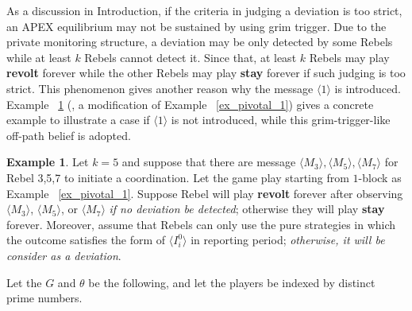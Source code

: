 \documentclass[12pt,letter]{article}
\theoremstyle{definition}
\newtheorem{example}{Example}[section]
\theoremstyle{remark}
\theoremstyle{claim}
\begin{document}
As a discussion in Introduction, if the criteria in judging a deviation is too strict, an APEX equilibrium may not be sustained by using grim trigger. Due to the private monitoring structure, a deviation may be only detected by some Rebels while at least $k$ Rebels cannot detect it. Since that, at least $k$ Rebels may play \textbf{revolt} forever while the other Rebels may play \textbf{stay} forever if such judging is too strict. This phenomenon gives another reason why the message $\langle 1 \rangle$ is introduced. Example ~\ref{ex_deviation} (, a modification of Example ~\ref{ex_pivotal_1}) gives a concrete example to illustrate a case if $\langle 1 \rangle$ is not introduced, while this grim-trigger-like off-path belief is adopted. 

\begin{example}\label{ex_deviation}
Let $k=5$ and suppose that there are message $\langle M_3 \rangle,\langle M_5 \rangle, \langle M_7 \rangle$ for Rebel 3,5,7 to initiate a coordination. Let the game play starting from $1$-block as Example ~\ref{ex_pivotal_1}. Suppose Rebel will play \textbf{revolt} forever after observing $\langle M_3 \rangle$, $\langle M_5 \rangle$, or $\langle M_7 \rangle$ \textit{if no deviation be detected}; otherwise they will play \textbf{stay} forever. Moreover, assume that Rebels can only use the pure strategies in which the outcome satisfies the form of $\langle I^0_i \rangle$ in reporting period; \textit{otherwise, it  will be consider as a deviation}. 

Let the $G$ and $\theta$ be the following, and let the players be indexed by distinct prime numbers.

\begin{center}


\end{center}




\end{example}
\end{document}
